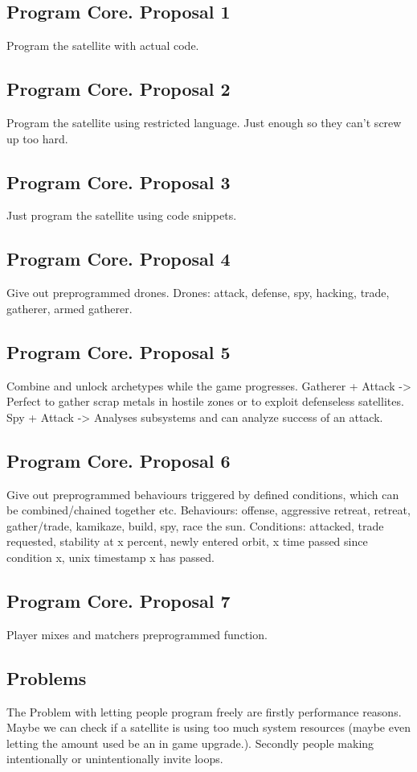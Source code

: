 \documentclass[a4paper]{scrreprt}
\begin{document}
        \subsection{Program Core. Proposal 1}
             Program the satellite with actual code.
        \subsection{Program Core. Proposal 2}
            Program the satellite using restricted language.
            Just enough so they can't screw up too hard.
        \subsection{Program Core. Proposal 3}
            Just program the satellite using code snippets.
        \subsection{Program Core. Proposal 4}
            Give out preprogrammed drones.
            Drones: attack, defense, spy, hacking, trade, gatherer, armed gatherer.
        \subsection{Program Core. Proposal 5}
            Combine and unlock archetypes while the game progresses.
            Gatherer + Attack -> Perfect to gather scrap metals in hostile zones or to exploit defenseless satellites. 
            Spy + Attack -> Analyses subsystems and can analyze success of an attack. 
        \subsection{Program Core. Proposal 6}
            Give out preprogrammed behaviours triggered by defined conditions, which can be combined/chained together etc.
            Behaviours: offense, aggressive retreat, retreat, gather/trade, kamikaze, build, spy, race the sun.
            Conditions: attacked, trade requested, stability at x percent, newly entered orbit, x time passed since condition x, unix timestamp x has passed.
        \subsection{Program Core. Proposal 7}
        Player mixes and matchers preprogrammed function.
        \subsection{Problems}
        The Problem with letting people program freely are firstly performance reasons. Maybe we can check if a satellite is using too much system resources (maybe even letting the amount used be an in game upgrade.). Secondly people making intentionally or unintentionally invite loops.
\end{document}
